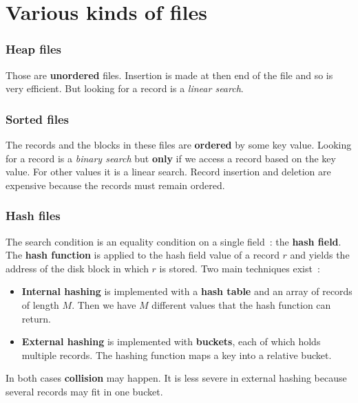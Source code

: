 \section{Various kinds of files}

\subsubsection*{Heap files}
Those are \textbf{unordered} files. Insertion is made at then end of the file and so is very efficient. But looking for a record is a \textit{linear search}.

\subsubsection*{Sorted files}
The records and the blocks in these files are \textbf{ordered} by some key value. Looking for a record is a \textit{binary search} but \textbf{only} if we access a record based on the key value. For other values it is a linear search. Record insertion and deletion are expensive because the records must remain ordered.

\subsubsection*{Hash files}
The search condition is an equality condition on a single field~: the \textbf{hash field}. The \textbf{hash function} is applied to the hash field value of a record $r$ and yields the address of the disk block in which $r$ is stored. Two main techniques exist~:

\begin{itemize}
    \item \textbf{Internal hashing} is implemented with a \textbf{hash table} and an array of records of length $M$. Then we have $M$ different values that the hash function can return.
    \item \textbf{External hashing} is implemented with \textbf{buckets}, each of which holds multiple records. The hashing function maps a key into a relative bucket.
\end{itemize}

In both cases \textbf{collision} may happen. It is less severe in external hashing because several records may fit in one bucket.